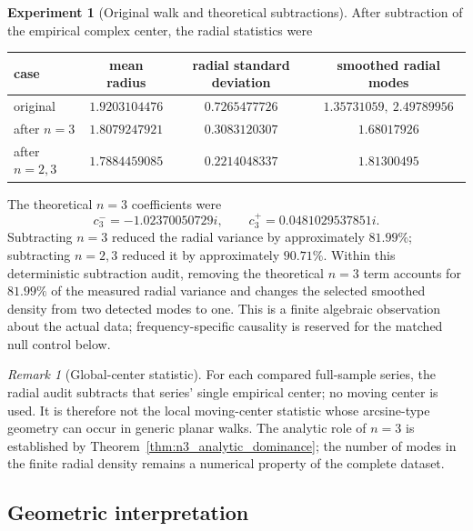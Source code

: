 \documentclass[11pt]{amsart}
\numberwithin{equation}{section}
\theoremstyle{plain}
\theoremstyle{definition}
\newtheorem{experiment}[theorem]{Experiment}
\theoremstyle{remark}
\newtheorem{remark}[theorem]{Remark}
\newcommand{\1}{\mathbf{1}}
\begin{document}
\begin{experiment}[Original walk and theoretical subtractions]
\label{exp:direct_radial_audit_detailed}
After subtraction of the empirical complex center, the radial statistics
were
\begin{center}
\begin{tabular}{lccc}
\toprule
case & mean radius & radial standard deviation & smoothed radial modes\\
\midrule
original & $1.9203104476$ & $0.7265477726$ & $1.35731059,\ 2.49789956$\\
after $n=3$ & $1.8079247921$ & $0.3083120307$ & $1.68017926$\\
after $n=2,3$ & $1.7884459085$ & $0.2214048337$ & $1.81300495$\\
\bottomrule
\end{tabular}
\end{center}
The theoretical $n=3$ coefficients were
\begin{equation}
c_3^-=-1.02370050729i,
\qquad
c_3^+=0.0481029537851i.
\label{eq:numerical_c3_coefficients_detailed}
\end{equation}
Subtracting $n=3$ reduced the radial variance by approximately
$81.99\%$; subtracting $n=2,3$ reduced it by approximately $90.71\%$.
Within this deterministic subtraction audit, removing the theoretical
$n=3$ term accounts for $81.99\%$ of the measured radial variance and changes
the selected smoothed density from two detected modes to one.  This is a
finite algebraic observation about the actual data; frequency-specific
causality is reserved for the matched null control below.
\end{experiment}


\begin{remark}[Global-center statistic]
\label{rem:global_center_radial_statistic}
For each compared full-sample series, the radial audit subtracts that
series' single empirical center; no moving center is used.  It is therefore
not the local moving-center statistic whose arcsine-type geometry can
occur in generic planar walks.  The analytic role of $n=3$ is established by
Theorem~\ref{thm:n3_analytic_dominance}; the number of modes in the finite
radial density remains a numerical property of the complete dataset.
\end{remark}

\subsection{Geometric interpretation}
\label{subsec:numerical_geometric_interpretation}
\end{document}
